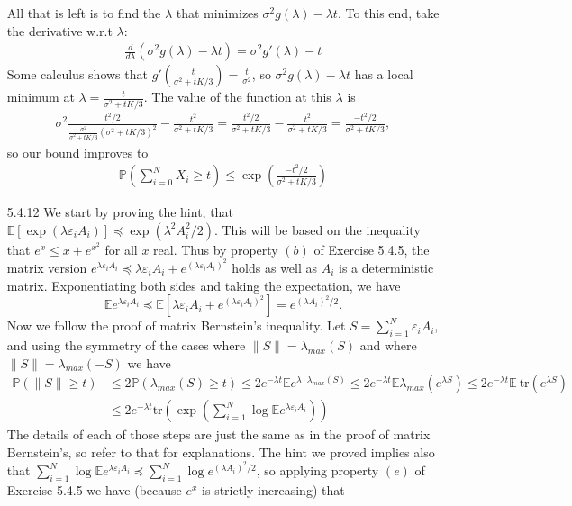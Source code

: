 \documentclass[11pt]{article}
\def\Pp{\mathbb P}
\def\E{\mathbb E}
\begin{document}
\begin{enumerate}
All that is left is to find the $ \lambda $ that minimizes $ \sigma^2 g(\lambda) - \lambda t $. To this end, take the derivative w.r.t $ \lambda $:
\begin{align*}
	\frac{d}{d\lambda} ( \sigma^2 g(\lambda) - \lambda t) = \sigma^2 g'(\lambda) - t
\end{align*}
Some calculus shows that $ g'(\frac{t}{\sigma^2 + tK/3}) = \frac{t}{\sigma^2} $, so $ \sigma^2 g(\lambda) - \lambda t $ has a local minimum at $ \lambda = \frac{t}{\sigma^2 + tK/3} $. The value of the function at this $ \lambda $ is 
\begin{align*}
	\sigma^2 \frac{t^2/2}{\frac{\sigma^2}{\sigma^2 + tK/3} (\sigma^2 + tK/3)^2 } - \frac{t^2}{\sigma^2 + tK/3}
	= \frac{t^2/2}{\sigma^2 + tK/3} - \frac{t^2}{\sigma^2 + tK/3}
	=\frac{-t^2/2}{\sigma^2 + tK/3},
\end{align*}
so our bound improves to 
\begin{align*}
	\Pp \left(\sum_{i=0}^{N} X_i \geq t\right) \leq \exp \left( \frac{-t^2/2}{\sigma^2 + tK/3} \right)
\end{align*}



\item[5.4.12] We start by proving the hint, that $ \E[\exp(\lambda \varepsilon_i A_i)] \preceq \exp(\lambda^2 A_i^2/2)  $. This will be based on the inequality that $ e^{x} \leq x + e^{x^2} $ for all $ x $ real. Thus by property $ (b) $ of Exercise 5.4.5, the matrix version $ e^{\lambda\varepsilon_i A_i} \preceq \lambda\varepsilon_i A_i + e^{(\lambda\varepsilon_i A_i)^2} $ holds as well as $ A_i $ is a deterministic matrix. Exponentiating both sides and taking the expectation, we have
\[ \E e^{\lambda \varepsilon_i A_i} \preceq \E \left[ \lambda\varepsilon_i A_i + e^{(\lambda\varepsilon_i A_i)^2} \right] = e^{(\lambda A_i)^2/2}. \]
Now we follow the proof of matrix Bernstein's inequality. Let $ S = \sum_{i=1}^{N} \varepsilon_i A_i $, and using the symmetry of the cases where $ \|S\| = \lambda_{max}(S) $ and where $ \|S\| = \lambda_{max}(-S) $ we have
\begin{align*}
	\Pp (\| S \| \geq t) &\leq 2\Pp (\lambda_{max}(S) \geq t) \leq 2e^{-\lambda t} \E e^{\lambda\cdot \lambda_{max}(S)} \leq 2e^{-\lambda t} \E \lambda_{max}(e^{\lambda S}) \leq 2e^{-\lambda t} \E \ \text{tr}(e^{\lambda S})\\
	&\leq 2e^{-\lambda t} \text{tr}\left(\exp\left( \sum_{i=1}^{N} \log \E e^{\lambda \varepsilon_i A_i} \right)\right)
\end{align*}
The details of each of those steps are just the same as in the proof of matrix Bernstein's, so refer to that for explanations. The hint we proved implies also that $ \sum_{i=1}^{N} \log \E e^{\lambda \varepsilon_i A_i} \preceq \sum_{i=1}^{N} \log e^{(\lambda A_i)^2/2} $, so applying property $ (e) $ of Exercise 5.4.5 we have (because $ e^x $ is strictly increasing) that


\end{enumerate}
\end{document}
